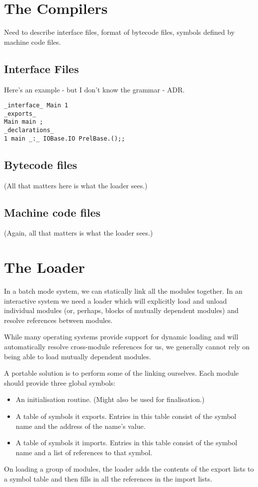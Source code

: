 \documentclass[11pt]{article}
\newcommand{\Section}[2]{\section{#1}\label{sec:#2}}
\newcommand{\Subsection}[2]{\subsection{#1}\label{sec:#2}}
\begin{document}
\Section{The Compilers}{compilers-overview}

Need to describe interface files, format of bytecode files, symbols
defined by machine code files.

\Subsection{Interface Files}{interface-files}

Here's an example - but I don't know the grammar - ADR.
\begin{verbatim}
_interface_ Main 1
_exports_
Main main ;
_declarations_
1 main _:_ IOBase.IO PrelBase.();;
\end{verbatim}

\Subsection{Bytecode files}{bytecode-files}

(All that matters here is what the loader sees.)

\Subsection{Machine code files}{asm-files}

(Again, all that matters is what the loader sees.)

\Section{The Loader}{loader-overview}

In a batch mode system, we can statically link all the modules
together.  In an interactive system we need a loader which will
explicitly load and unload individual modules (or, perhaps, blocks of
mutually dependent modules) and resolve references between modules.

While many operating systems provide support for dynamic loading and
will automatically resolve cross-module references for us, we generally
cannot rely on being able to load mutually dependent modules.

A portable solution is to perform some of the linking ourselves.  Each module
should provide three global symbols: 
\begin{itemize}
\item
An initialisation routine.  (Might also be used for finalisation.)
\item
A table of symbols it exports.
Entries in this table consist of the symbol name and the address of the
name's value.
\item
A table of symbols it imports.
Entries in this table consist of the symbol name and a list of references
to that symbol.
\end{itemize}

On loading a group of modules, the loader adds the contents of the
export lists to a symbol table and then fills in all the references in the
import lists.
\end{document}
